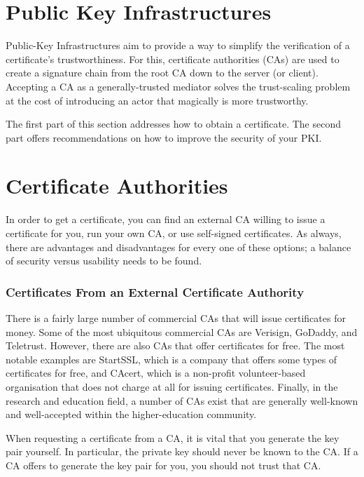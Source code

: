 \section{Public Key Infrastructures}
\label{section:PKIs}

Public-Key Infrastructures aim to provide a way to simplify the verification of
a certificate's trustworthiness.  For this, certificate authorities (CAs) are
used to create a signature chain from the root CA down to the server (or client).
Accepting a CA as a generally-trusted mediator solves the trust-scaling problem
at the cost of introducing an actor that magically is more trustworthy.

The first part of this section addresses how to obtain a certificate.  The
second part offers recommendations on how to improve the security of your
PKI.

\section{Certificate Authorities}
\label{sec:cas}
In order to get a certificate, you can find an external CA willing to issue
a certificate for you, run your own CA, or use self-signed certificates.
As always, there are advantages and disadvantages for every one of these
options; a balance of security versus usability needs to be found.

\subsubsection{Certificates From an External Certificate Authority}
\label{sec:signcertfromca}

There is a fairly large number of commercial CAs that will issue
certificates for money.  Some of the most ubiquitous commercial CAs are
Verisign, GoDaddy, and Teletrust.  However, there are also CAs that offer
certificates for free.  The most notable examples are StartSSL, which is a
company that offers some types of certificates for free, and CAcert, which
is a non-profit volunteer-based organisation that does not charge at all
for issuing certificates.  Finally, in the research and education field, a
number of CAs exist that are generally well-known and well-accepted within
the higher-education community.

When requesting a certificate from a CA, it is vital that you generate the
key pair yourself.  In particular, the private key should never be known to
the CA.  If a CA offers to generate the key pair for you, you should not
trust that CA.

